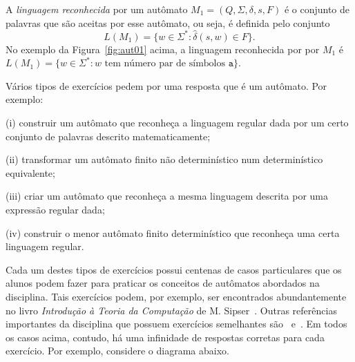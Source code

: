 \documentclass[
	12pt,				%
	openany,
	oneside,
	a4paper,			%
	english,			%
	brazil				%
	]{abntex2}
\begin{document}
  A \emph{linguagem reconhecida} por um autômato $M_1 = (Q, \Sigma, \delta, s, F)$ é o conjunto de palavras que são aceitas por esse autômato, ou seja, é definida pelo conjunto \[ L(M_1) = \{w \in \Sigma^* \colon \hat{\delta}(s, w) \in F \}.  \] No exemplo da Figura~\ref{fig:aut01} acima, a linguagem reconhecida por por $M_1$ é $L(M_1) = \{w \in \Sigma^* :  w \text{ tem número par de símbolos } \mathtt{a}\}$.
  \bigskip



  Vários tipos de exercícios pedem por uma resposta que é um autômato. Por exemplo:
  \begin{alineas}%
    \item[(i)] construir um autômato que reconheça a linguagem regular
      dada por um certo conjunto de palavras descrito matematicamente;
    \item[(ii)] transformar um autômato finito não determinístico num
      determinístico equivalente;
    \item[(iii)] criar um autômato que reconheça a mesma linguagem
      descrita por uma expressão regular dada;
    \item[(iv)] construir o menor autômato finito determinístico
      que reconheça uma certa linguagem regular.
  \end{alineas}



  Cada um destes tipos de exercícios possui centenas de casos particulares que os alunos podem fazer para praticar os conceitos de autômatos abordados na disciplina. Tais exercícios podem, por exemplo, ser encontrados abundantemente no livro \textit{Introdução à Teoria da Computação} de M. Sipser~\cite{sipser}. Outras referências importantes da disciplina que possuem exercícios semelhantes são~\cite{ullman} e~\cite{linz}. Em todos os casos acima, contudo, há uma infinidade de respostas corretas para cada exercício. Por exemplo, considere o diagrama abaixo.
\end{document}
